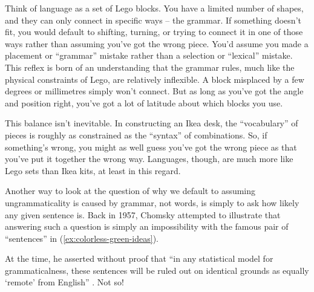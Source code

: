 Think of language as a set of Lego blocks. You have a limited number of shapes, and they can only connect in specific ways -- the grammar. If something doesn't fit, you would default to shifting, turning, or trying to connect it in one of those ways rather than assuming you've got the wrong piece. You'd assume you made a placement or ``grammar'' mistake rather than a selection or ``lexical'' mistake. This reflex is born of an understanding that the grammar rules, much like the physical constraints of Lego, are relatively inflexible. A block misplaced by a few degrees or millimetres simply won't connect. But as long as you've got the angle and position right, you've got a lot of latitude about which blocks you use.

This balance isn't inevitable. In constructing an Ikea desk, the ``vocabulary'' of pieces is roughly as constrained as the ``syntax'' of combinations. So, if something's wrong, you might as well guess you've got the wrong piece as that you've put it together the wrong way. Languages, though, are much more like Lego sets than Ikea kits, at least in this regard.

Another way to look at the question of why we default to assuming ungrammaticality is caused by grammar, not words, is simply to ask how likely any given sentence is. Back in 1957, Chomsky attempted to illustrate that answering such a question is simply an impossibility with the famous pair of ``sentences'' in (\ref{ex:colorless-green-ideas}).

\ea \label{ex:colorless-green-ideas}
    \z
\z

At the time, he asserted without proof that ``in any statistical model for grammaticalness, these sentences will be ruled out on identical grounds as equally `remote' from English'' \citep[15]{Chomsky1957}. Not so!

